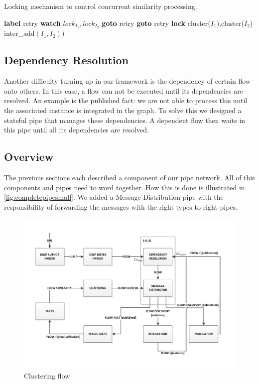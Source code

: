 \begin{algorithm}
\caption{Locking mechanism to control concurrent similarity processing.}
\label{locking}
\begin{algorithmic}
  \STATE \textbf{label} retry
  \STATE \textbf{watch} ${lock}_{I_1},{lock}_{I_2}$
  \STATE \textbf{goto} retry
    \STATE \textbf{goto} retry
  \ENDIF
\ELSE
  \STATE \textbf{lock} cluster($I_1$),cluster($I_2$)
  \STATE inter\_add$(I_1,I_2))$
\ENDIF
\end{algorithmic}
\end{algorithm}

\subsection{Dependency Resolution}
\label{dependencies}

Another difficulty turning up in our framework is the dependency of certain flow onto others. In this case, a flow can not be executed until its dependencies are resolved. An example is the published fact: we are not able to process this until the associated instance is integrated in the graph. To solve this we designed a stateful pipe that manages these dependencies. A dependent flow then waits in this pipe until all its dependencies are resolved.

\subsection{Overview}

The previous sections each described a component of our pipe network. All of this components and pipes need to word together. How this is done is illustrated in \autoref{fig:completepipesmall}. We added a Message Distribution pipe with the responsibility of forwarding the messages with the right types to right pipes.

\begin{figure}[htb]
	\centering
		\includegraphics[width=1\textwidth]{fig/completepipesmall}
	\caption{Clustering flow}
	\label{fig:completepipesmall}
\end{figure}


